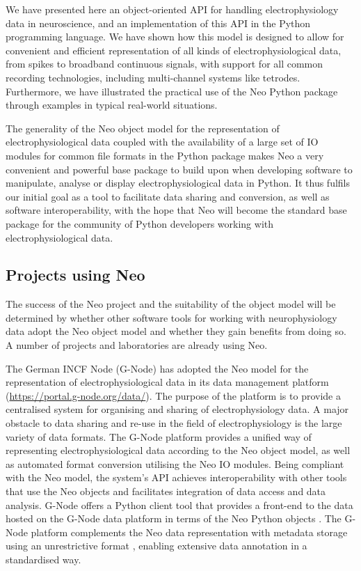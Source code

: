 \documentclass{frontiers}
\begin{document}
We have presented here an object-oriented API for handling electrophysiology data in neuroscience, and an implementation of this API in the Python programming language. 
We have shown how this model is designed to allow for convenient and efficient representation of all kinds of electrophysiological data, from spikes to broadband continuous signals, with support for all common recording technologies, including multi-channel systems like tetrodes.
Furthermore, we have illustrated the practical use of the Neo Python package through examples in typical real-world situations.

The generality of the Neo object model for the representation of electrophysiological data coupled with the availability of a large set of IO modules for common file formats in the Python package makes Neo a very convenient and powerful base package to build upon when developing software to manipulate, analyse or display electrophysiological data in Python.
It thus fulfils our initial goal as a tool to facilitate data sharing and conversion, as well as software interoperability, with the hope that Neo will become the standard base package for the community of Python developers working with electrophysiological data.

\subsection{Projects using Neo}

The success of the Neo project and the suitability of the object model will be determined by whether other software tools for working with neurophysiology data adopt the Neo object model and whether they gain benefits from doing so. A number of projects and laboratories are already using Neo.

The German INCF Node (G-Node) has adopted the Neo model for the representation of electrophysiological data in its data management platform (\url{https://portal.g-node.org/data/}).
The purpose of the platform is to provide a centralised system for organising and sharing of electrophysiology data.
A major obstacle to data sharing and re-use in the field of electrophysiology is the large variety of data formats.
The G-Node platform provides a unified way of representing electrophysiological data according to the Neo object model, as well as automated format conversion utilising the Neo IO modules.
Being compliant with the Neo model, the system's API achieves interoperability with other tools that use the Neo objects and facilitates integration of data access and data analysis.
G-Node offers a Python client tool that provides a front-end to the data hosted on the G-Node data platform in terms of the Neo Python objects \citep{Sobolev2014}.
The G-Node platform complements the Neo data representation with metadata storage using an unrestrictive format \citep{Grewe2011}, enabling extensive data annotation in a standardised way.
\end{document}
